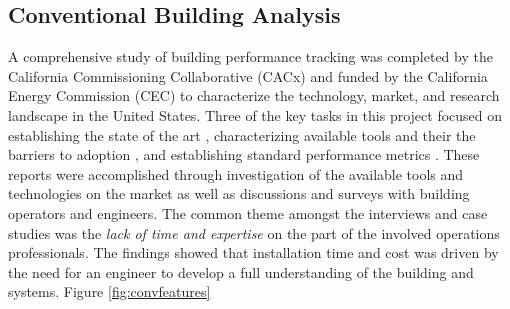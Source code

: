 \subsection{Conventional Building Analysis}
A comprehensive study of building performance tracking was completed by the California Commissioning Collaborative (CACx) and funded by the California Energy Commission (CEC) to characterize the technology, market, and research landscape in the United States. Three of the key tasks in this project focused on establishing the state of the art \cite{Effinger:2010tm}, characterizing available tools and their the barriers to adoption \cite{Ulickey:2010ut}, and establishing standard performance metrics \cite{Greensfelder:2010wl}. These reports were accomplished through investigation of the available tools and technologies on the market as well as discussions and surveys with building operators and engineers. The common theme amongst the interviews and case studies was the \emph{lack of time and expertise} on the part of the involved operations professionals. The findings showed that installation time and cost was driven by the need for an engineer to develop a full understanding of the building and systems. Figure \ref{fig:convfeatures}